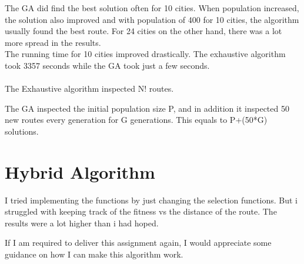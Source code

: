 \documentclass[12pt]{article}
\begin{document}
The GA did find the best solution often for 10 cities. When population increased, the solution also improved and with population of 400 for 10 cities, the algorithm usually found the best route.
For 24 cities on the other hand, there was a lot more spread in the results.\\


The running time for 10 cities improved drastically. The exhaustive algorithm took 3357 seconds while the GA took just a few seconds.\\
\\
The Exhaustive algorithm inspected N! routes.

The GA inspected the initial population size P, and in addition it inspected 50 new routes every generation for G generations. This equals to P+(50*G) solutions.


\section{Hybrid Algorithm}
I tried implementing the functions by just changing the selection functions. But i struggled with keeping track of the fitness vs the distance of the route. The results were a lot higher than i had hoped.

If I am required to deliver this assignment again, I would appreciate some guidance on how I can make this algorithm work.
\end{document}
